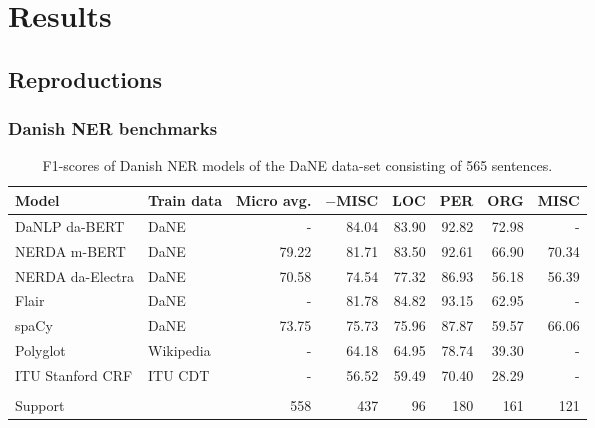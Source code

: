 \documentclass[main.tex]{subfiles}
\begin{document}
\chapter{Results}

\section{Reproductions}
\subsection{Danish NER benchmarks}
\begin{table}[H]
	\begin{center}
		\begin{tabular}{l l r r r r r r}
			Model & Train data & Micro avg. & $-$MISC & LOC & PER & ORG & MISC \\
			\hline
			DaNLP da-BERT & DaNE & - & 84.04 & 83.90 & 92.82 & 72.98 & - \\
			NERDA m-BERT & DaNE & 79.22 & 81.71 & 83.50 & 92.61 & 66.90 & 70.34 \\
			NERDA da-Electra & DaNE & 70.58 & 74.54 & 77.32 & 86.93 & 56.18 & 56.39 \\
			Flair & DaNE & - & 81.78 & 84.82 & 93.15 & 62.95 & - \\
			spaCy & DaNE & 73.75 & 75.73 & 75.96 & 87.87 & 59.57 & 66.06 \\
			Polyglot & Wikipedia & - & 64.18 & 64.95 & 78.74 & 39.30 & - \\
			ITU Stanford CRF & ITU CDT & - & 56.52 & 59.49 & 70.40 & 28.29 & - \\
			 &  &  &  &  &  &  &  \\
			Support &  & 558 & 437 & 96 & 180 & 161 & 121 \\
		\end{tabular}
	\end{center}
	\caption{F1\pro-scores of Danish NER models of the DaNE data-set consisting of 565 sentences.}
	\label{tab:DaNE}
\end{table}
\end{document}
